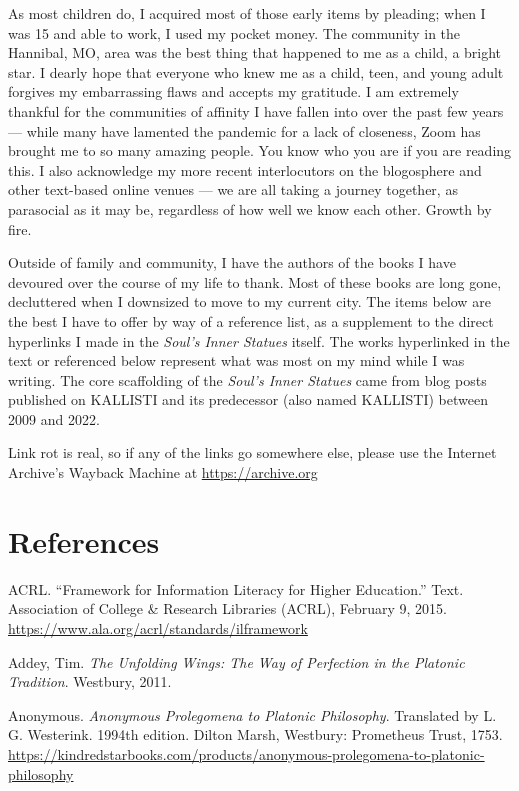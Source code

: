 \documentclass[
]{book}
\begin{document}
As most children do, I acquired most of those early items by pleading; when I was 15 and able to work, I used my pocket money. The community in the Hannibal, MO, area was the best thing that happened to me as a child, a bright star. I dearly hope that everyone who knew me as a child, teen, and young adult forgives my embarrassing flaws and accepts my gratitude. I am extremely thankful for the communities of affinity I have fallen into over the past few years --- while many have lamented the pandemic for a lack of closeness, Zoom has brought me to so many amazing people. You know who you are if you are reading this. I also acknowledge my more recent interlocutors on the blogosphere and other text-based online venues --- we are all taking a journey together, as parasocial as it may be, regardless of how well we know each other. Growth by fire.

Outside of family and community, I have the authors of the books I have devoured over the course of my life to thank. Most of these books are long gone, decluttered when I downsized to move to my current city. The items below are the best I have to offer by way of a reference list, as a supplement to the direct hyperlinks I made in the \emph{Soul's Inner Statues} itself. The works hyperlinked in the text or referenced below represent what was most on my mind while I was writing. The core scaffolding of the \emph{Soul's Inner Statues} came from blog posts published on KALLISTI and its predecessor (also named KALLISTI) between 2009 and 2022.

Link rot is real, so if any of the links go somewhere else, please use the Internet Archive's Wayback Machine at \url{https://archive.org}

\hypertarget{references}{%
\section{References}\label{references}}

ACRL. ``Framework for Information Literacy for Higher Education.'' Text. Association of College \& Research Libraries (ACRL), February 9, 2015. \url{https://www.ala.org/acrl/standards/ilframework}

Addey, Tim. \emph{The Unfolding Wings: The Way of Perfection in the Platonic Tradition}. Westbury, 2011.

Anonymous. \emph{Anonymous Prolegomena to Platonic Philosophy}. Translated by L. G. Westerink. 1994th edition. Dilton Marsh, Westbury: Prometheus Trust, 1753. \url{https://kindredstarbooks.com/products/anonymous-prolegomena-to-platonic-philosophy}
\end{document}
